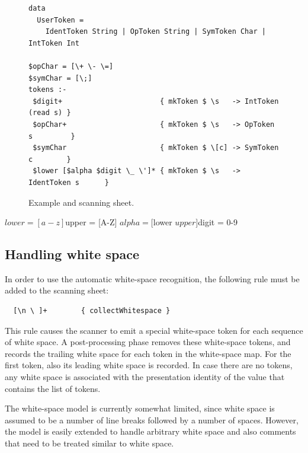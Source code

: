 \documentclass{article}[10pt]
\begin{document}
\begin{figure}
\begin{center}
\begin{footnotesize}
\begin{verbatim}
data 
  UserToken = 
    IdentToken String | OpToken String | SymToken Char | IntToken Int

$opChar = [\+ \- \=]
$symChar = [\;]
tokens :-
 $digit+                       { mkToken $ \s   -> IntToken (read s) }
 $opChar+                      { mkToken $ \s   -> OpToken s         }
 $symChar                      { mkToken $ \[c] -> SymToken c        }
 $lower [$alpha $digit \_ \']* { mkToken $ \s   -> IdentToken s      }
\end{verbatim}
\end{footnotesize}
\caption{Example  and scanning sheet.} \label{fig:scannerSheet} 
\end{center}
\end{figure}
\bc
$lower = [a-z]
$upper = [A-Z]
$alpha = [$lower $upper]
$digit = 0-9		
\ec


\subsection{Handling white space}

In order to use the automatic white-space recognition, the following rule must be added to the scanning sheet:

\begin{footnotesize}
\begin{verbatim}
  [\n \ ]+        { collectWhitespace }
\end{verbatim} 
\end{footnotesize}

This rule causes the scanner to emit a special white-space token for each sequence of white space. A post-processing phase removes these white-space tokens, and records the trailing white space for each token in the white-space map. For the first token, also its leading white space is recorded. In case there are no tokens, any white space is associated with the presentation identity of the  value that contains the list of tokens. 


The white-space model is currently somewhat limited, since white space is assumed to be a number of line breaks followed by a number of spaces. However, the model is easily extended to handle arbitrary white space and also comments that need to be treated similar to white space.
\end{document}

